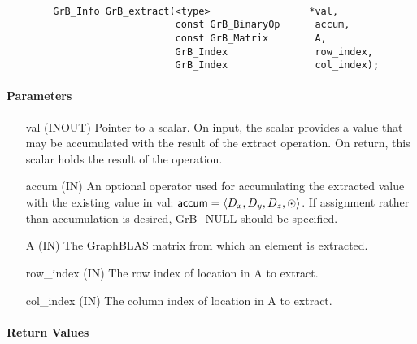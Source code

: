 \paragraph{\syntax}

\begin{verbatim}
        GrB_Info GrB_extract(<type>                 *val,
                             const GrB_BinaryOp      accum,
                             const GrB_Matrix        A,
                             GrB_Index               row_index,
                             GrB_Index               col_index); 

\end{verbatim}

\paragraph{Parameters}

\begin{itemize}[leftmargin=1in]
    \item[{\sf val}]   ({\sf INOUT}) Pointer to a scalar. On input, the scalar
    provides a value that may be accumulated with the result of the extract
    operation.  On return, this scalar holds the result of the operation.

    \item[{\sf accum}] ({\sf IN}) An optional operator used for accumulating
    the extracted value with the existing value in {\sf val}: 
    ${\sf accum} = \langle D_x, D_y, D_z,\odot \rangle$. If assignment rather 
    than accumulation is desired, {\sf GrB\_NULL} should be specified.

    \item[{\sf A}]     ({\sf IN}) The GraphBLAS matrix from which an element is
    extracted.
    
    \item[{\sf row\_index}] ({\sf IN}) The row index of location in {\sf A} 
    to extract.

    \item[{\sf col\_index}] ({\sf IN}) The column index of location in {\sf A} 
    to extract.
\end{itemize}

\paragraph{Return Values}

